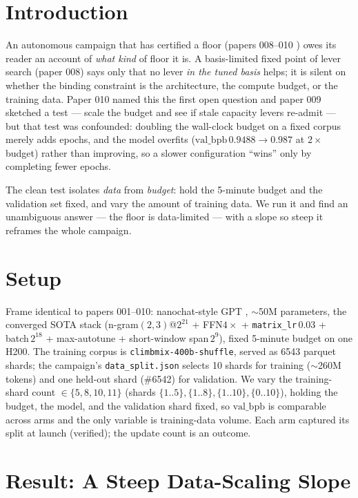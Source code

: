 \documentclass{article}
\newcommand{\valbpb}{\mathrm{val\_bpb}}
\begin{document}
\section{Introduction}
\label{sec:intro}

An autonomous campaign that has certified a floor (papers 008--010 \cite{ophis2026convergence,ophis2026floor,ophis2026capstone2}) owes its reader an account of \emph{what kind} of floor it is. A basis-limited fixed point of lever search (paper 008) says only that no lever \emph{in the tuned basis} helps; it is silent on whether the binding constraint is the architecture, the compute budget, or the training data. Paper 010 named this the first open question and paper 009 sketched a test --- scale the budget and see if stale capacity levers re-admit --- but that test was confounded: doubling the wall-clock budget on a fixed corpus merely adds epochs, and the model overfits ($\valbpb\,0.9488\to0.987$ at $2\times$ budget) rather than improving, so a slower configuration ``wins'' only by completing fewer epochs.

The clean test isolates \emph{data} from \emph{budget}: hold the 5-minute budget and the validation set fixed, and vary the amount of training data. We run it and find an unambiguous answer --- the floor is data-limited --- with a slope so steep it reframes the whole campaign.

\section{Setup}
\label{sec:setup}

Frame identical to papers 001--010: nanochat-style GPT \cite{karpathy2025nanochat}, $\sim$50M parameters, the converged SOTA stack (n-gram$(2,3)$@$2^{21}$ + FFN$4\times$ + \texttt{matrix\_lr}\,$0.03$ + batch\,$2^{18}$ + max-autotune + short-window span\,$2^{9}$), fixed 5-minute budget on one H200. The training corpus is \texttt{climbmix-400b-shuffle}, served as 6543 parquet shards; the campaign's \texttt{data\_split.json} selects 10 shards for training ($\sim$260M tokens) and one held-out shard (\#6542) for validation. We vary the training-shard count $\in\{5,8,10,11\}$ (shards $\{1..5\},\{1..8\},\{1..10\},\{0..10\}$), holding the budget, the model, and the validation shard fixed, so $\valbpb$ is comparable across arms and the only variable is training-data volume. Each arm captured its split at launch (verified); the update count is an outcome.

\section{Result: A Steep Data-Scaling Slope}
\label{sec:result}
\end{document}
